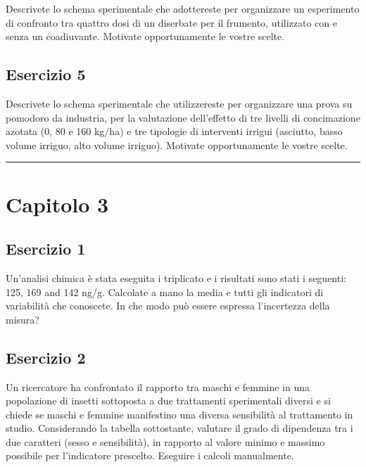 \documentclass[a4paper,12pt,oneside]{book}
\begin{document}
Descrivete lo schema sperimentale che adottereste per organizzare un esperimento di confronto tra quattro dosi di un diserbate per il frumento, utilizzato con e senza un coadiuvante. Motivate opportunamente le vostre scelte.

\hypertarget{esercizio-5}{%
\subsection{Esercizio 5}\label{esercizio-5}}

Descrivete lo schema sperimentale che utilizzereste per organizzare una prova su pomodoro da industria, per la valutazione dell'effetto di tre livelli di concimazione azotata (0, 80 e 160 kg/ha) e tre tipologie di interventi irrigui (asciutto, basso volume irriguo, alto volume irriguo). Motivate opportunamente le vostre scelte.

\begin{center}\rule{0.5\linewidth}{0.5pt}\end{center}

\hypertarget{capitolo-3}{%
\section{Capitolo 3}\label{capitolo-3}}

\hypertarget{esercizio-1-1}{%
\subsection{Esercizio 1}\label{esercizio-1-1}}

Un'analisi chimica è stata eseguita i triplicato e i risultati sono stati i seguenti: 125, 169 and 142 ng/g. Calcolate a mano la media e tutti gli indicatori di variabilità che conoscete. In che modo può essere espressa l'incertezza della misura?

\hypertarget{esercizio-2-1}{%
\subsection{Esercizio 2}\label{esercizio-2-1}}

Un ricercatore ha confrontato il rapporto tra maschi e femmine in una popolazione di insetti sottoposta a due trattamenti sperimentali diversi e si chiede se maschi e femmine manifestino una diversa sensibilità al trattamento in studio. Considerando la tabella sottostante, valutare il grado di dipendenza tra i due caratteri (sesso e sensibilità), in rapporto al valore minimo e massimo possibile per l'indicatore prescelto. Eseguire i calcoli manualmente.
\end{document}

